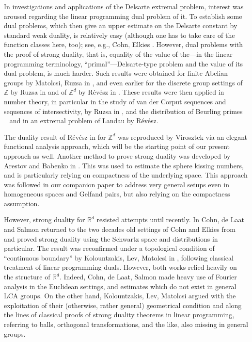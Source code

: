 \documentclass[[a4paper,english,12pt]{amsart}
\theoremstyle{plain}
\theoremstyle{remark}
\newcommand{\ZZ}{\mathbb Z}
\newcommand{\RR}{\mathbb R}
\begin{document}
In investigations and applications of the Delsarte extremal problem,
interest was aroused regarding the linear programming dual problem of it. To establish some dual problems, which then give an upper estimate on the Delsarte constant by standard weak duality, is relatively easy (although one has to take care of the function classes here, too); see, e.g., Cohn, Elkies \cite{cohn:packings}. However, dual problems with the proof of strong duality, that is, equality of the value of the---in the linear programming terminology, ``primal''---Delsarte-type problem and the value of its dual problem, is much harder. Such results were obtained for finite Abelian groups by Matolcsi, Ruzsa in \cite{MatolcsiRuzsa}, and even earlier for the discrete group settings of $\ZZ$ by Ruzsa in \cite{Ruzsa1981} and of $\ZZ^d$ by R\'ev\'esz in \cite{R-Austral}. These results were then applied in number theory, in particular in the study of van der Corput sequences and sequences of intersectivity, by Ruzsa in \cite{Ruzsa1981}, and the distribution of Beurling primes ~\cite{Revesz-Beurling} and in an extremal problem of Landau \cite{R-Landau} by  R\'ev\'esz.

The duality result of R\'ev\'esz in \cite{R-Austral} for $\ZZ^d$ was reproduced by Virosztek \cite{virosztek} via an elegant functional analysis approach, which will be the starting point of our present approach as well. Another method to prove strong duality was developed by Arestov and Babenko in \cite{AB}. This was used to estimate the sphere kissing numbers, and is particularly relying on compactness of the underlying space. This approach was followed in our companion paper \cite{UFO} to address very general setups even in homogeneous spaces and Gelfand pairs, but also relying on the compactness assumption.

However, strong duality for $\RR^d$ resisted attempts until recently. In \cite{Cohn-Laat-Salmon} Cohn, de Laat and Salmon returned to the two decades old settings of Cohn and Elkies from \cite{cohn:packings} and proved strong duality using the Schwartz space and distributions in particular. The result was reconfirmed under a topological condition of ``continuous boundary'' by Kolountzakis, Lev, Matolcsi in \cite{KLM25}, following classical treatment of linear programming duals. However, both works relied heavily on the structure of $\RR^d$. Indeed, Cohn, de Laat, Salmon \cite{Cohn-Laat-Salmon} made heavy use of Fourier analysis in the Euclidean settings, and estimates which do not exist in general LCA groups. On the other hand, Kolountzakis, Lev, Matolcsi  \cite{KLM25} argued with the exploitation of their (otherwise, rather general) geometrical condition and along the lines of classical proofs of strong duality theorems in linear programming, referring to balls, orthogonal transformations, and the like, also missing in general groups.
\end{document}
